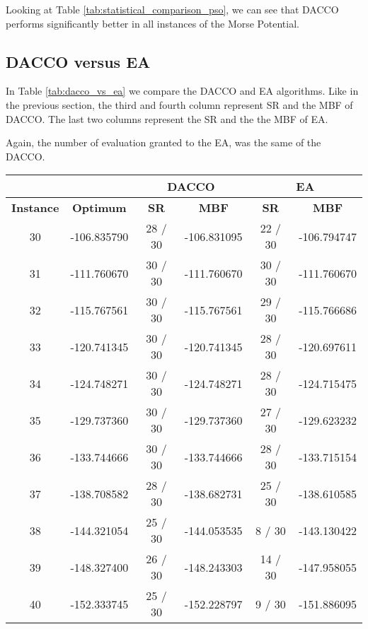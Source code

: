 		Looking at Table \ref{tab:statistical_comparison_pso}, we can see that DACCO performs significantly better in all instances of the Morse Potential.
		\pagebreak
		
		\subsection{DACCO versus EA}
		
			In Table \ref{tab:dacco_vs_ea} we compare the DACCO and EA algorithms. Like in the previous section, the third and fourth column represent SR and the MBF of DACCO. The last two columns represent the SR and the the MBF of EA. 
			
			Again, the number of evaluation granted to the EA, was the same of the DACCO. 

		\begin{table}[!htdp]
				\begin{center}
					\begin{tabular}{| c | c | c | c | c | c |}
						\hline
						\multicolumn{2}{|c|}{} & \multicolumn{2}{c|}{\textbf{DACCO}} & \multicolumn{2}{c|}{\textbf{EA}}\\ \hline
						\textbf{Instance} & \textbf{Optimum} & \textbf{SR} & \textbf{MBF} & \textbf{SR} & \textbf{MBF} \\ \hline
						30 & -106.835790 & 28 / 30 & -106.831095 & 22 / 30 & -106.794747 \\ \hline
						31 & -111.760670 & 30 / 30 & -111.760670 & 30 / 30 & -111.760670 \\ \hline
						32 & -115.767561 & 30 / 30 & -115.767561 & 29 / 30 & -115.766686 \\ \hline
						33 & -120.741345 & 30 / 30 & -120.741345 & 28 / 30 & -120.697611 \\ \hline
						34 & -124.748271 & 30 / 30 & -124.748271 & 28 / 30 & -124.715475 \\ \hline
						35 & -129.737360 & 30 / 30 & -129.737360 & 27 / 30 & -129.623232 \\ \hline
						36 & -133.744666 & 30 / 30 & -133.744666 & 28 / 30 & -133.715154 \\ \hline
						37 & -138.708582 & 28 / 30 & -138.682731 & 25 / 30 & -138.610585 \\ \hline
						38 & -144.321054 & 25 / 30 & -144.053535 & 8 / 30 & -143.130422 \\ \hline
						39 & -148.327400 & 26 / 30 & -148.243303 & 14 / 30 & -147.958055 \\ \hline
						40 & -152.333745 & 25 / 30 & -152.228797 & 9 / 30 & -151.886095 \\ \hline

\end{tabular}
\end{center}
\end{table}
